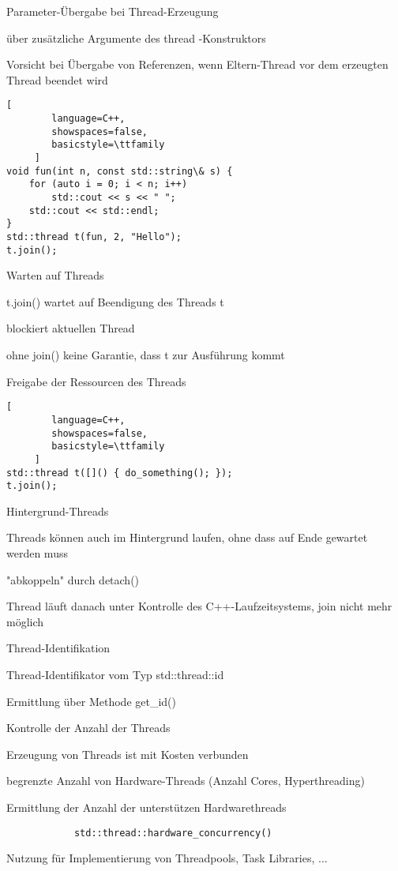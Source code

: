 \documentclass[10pt]{article}
\begin{document}
\begin{itemize*}
Parameter-Übergabe bei Thread-Erzeugung
\begin{itemize*}
  \item über zusätzliche Argumente des thread -Konstruktors
  \item Vorsicht bei Übergabe von Referenzen, wenn Eltern-Thread vor dem erzeugten Thread beendet wird
\end{itemize*}
\begin{lstlisting}[
        language=C++,
        showspaces=false,
        basicstyle=\ttfamily
     ]
void fun(int n, const std::string\& s) {
    for (auto i = 0; i < n; i++)
        std::cout << s << " ";
    std::cout << std::endl;
}
std::thread t(fun, 2, "Hello");
t.join();
\end{lstlisting}

Warten auf Threads
\begin{itemize*}
  \item t.join() wartet auf Beendigung des Threads t
  \item blockiert aktuellen Thread
  \item ohne join() keine Garantie, dass t zur Ausführung kommt
  \item Freigabe der Ressourcen des Threads
\end{itemize*}
\begin{lstlisting}[
        language=C++,
        showspaces=false,
        basicstyle=\ttfamily
     ]
std::thread t([]() { do_something(); });
t.join();
\end{lstlisting}

Hintergrund-Threads
\begin{itemize*}
  \item Threads können auch im Hintergrund laufen, ohne dass auf Ende gewartet werden muss
  \item "abkoppeln" durch detach()
  \item Thread läuft danach unter Kontrolle des C++-Laufzeitsystems, join nicht mehr möglich
\end{itemize*}

Thread-Identifikation
\begin{itemize*}
  \item Thread-Identifikator vom Typ std::thread::id
  \item Ermittlung über Methode get\_id()
\end{itemize*}

Kontrolle der Anzahl der Threads
\begin{itemize*}
  \item Erzeugung von Threads ist mit Kosten verbunden
  \item begrenzte Anzahl von Hardware-Threads (Anzahl Cores, Hyperthreading)
  \item Ermittlung der Anzahl der unterstützen Hardwarethreads
  \begin{lstlisting}
            std::thread::hardware_concurrency()
          \end{lstlisting}
  \item Nutzung für Implementierung von Threadpools, Task Libraries, ...
\end{itemize*}



\end{itemize*}
\end{document}
